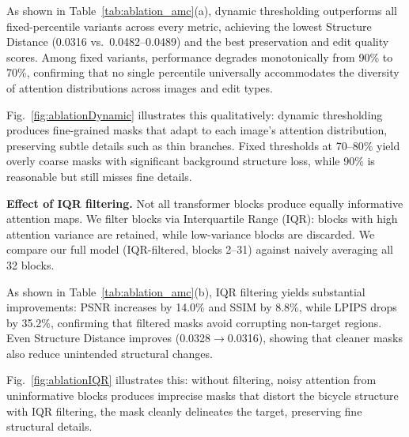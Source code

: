 

As shown in Table~\ref{tab:ablation_amc}(a), dynamic thresholding outperforms all fixed-percentile variants across every metric, achieving the lowest Structure Distance (0.0316 vs.\ 0.0482--0.0489) and the best preservation and edit quality scores. Among fixed variants, performance degrades monotonically from 90\% to 70\%, confirming that no single percentile universally accommodates the diversity of attention distributions across images and edit types.



Fig.~\ref{fig:ablationDynamic} illustrates this qualitatively: dynamic thresholding produces fine-grained masks that adapt to each image's attention distribution, preserving subtle details such as thin branches. Fixed thresholds at 70--80\% yield overly coarse masks with significant background structure loss, while 90\% is reasonable but still misses fine details.

\noindent\textbf{Effect of IQR filtering.}
Not all transformer blocks produce equally informative attention maps. We filter blocks via Interquartile Range (IQR): blocks with high attention variance are retained, while low-variance blocks are discarded. We compare our full model (IQR-filtered, blocks 2--31) against naively averaging all 32 blocks.

As shown in Table~\ref{tab:ablation_amc}(b), IQR filtering yields substantial improvements: PSNR increases by 14.0\% and SSIM by 8.8\%, while LPIPS drops by 35.2\%, confirming that filtered masks avoid corrupting non-target regions. Even Structure Distance improves (0.0328$\to$0.0316), showing that cleaner masks also reduce unintended structural changes.



Fig.~\ref{fig:ablationIQR} illustrates this: without filtering, noisy attention from uninformative blocks produces imprecise masks that distort the bicycle structure
with IQR filtering, the mask cleanly delineates the target, preserving fine structural details.

